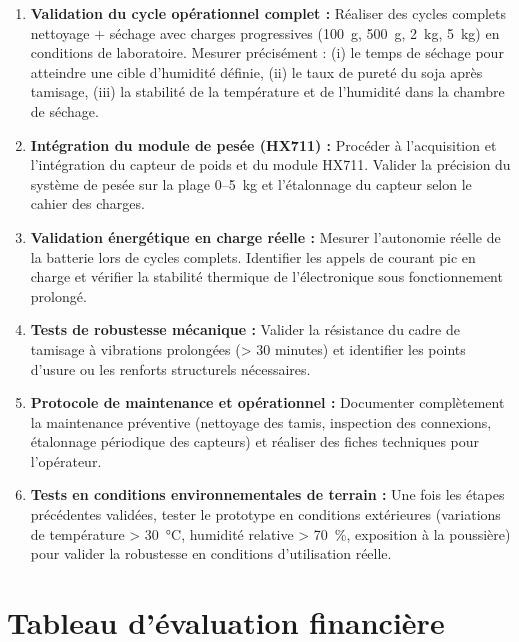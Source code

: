 \begin{enumerate}
    \item \textbf{Validation du cycle opérationnel complet :} Réaliser des cycles complets nettoyage + séchage avec charges progressives (100~g, 500~g, 2~kg, 5~kg) en conditions de laboratoire. Mesurer précisément : (i) le temps de séchage pour atteindre une cible d'humidité définie, (ii) le taux de pureté du soja après tamisage, (iii) la stabilité de la température et de l'humidité dans la chambre de séchage.
    
    \item \textbf{Intégration du module de pesée (HX711) :} Procéder à l'acquisition et l'intégration du capteur de poids et du module HX711. Valider la précision du système de pesée sur la plage 0--5~kg et l'étalonnage du capteur selon le cahier des charges.
    
    \item \textbf{Validation énergétique en charge réelle :} Mesurer l'autonomie réelle de la batterie lors de cycles complets. Identifier les appels de courant pic en charge et vérifier la stabilité thermique de l'électronique sous fonctionnement prolongé.
    
    \item \textbf{Tests de robustesse mécanique :} Valider la résistance du cadre de tamisage à vibrations prolongées (> 30 minutes) et identifier les points d'usure ou les renforts structurels nécessaires.
    
    \item \textbf{Protocole de maintenance et opérationnel :} Documenter complètement la maintenance préventive (nettoyage des tamis, inspection des connexions, étalonnage périodique des capteurs) et réaliser des fiches techniques pour l'opérateur.
    
    \item \textbf{Tests en conditions environnementales de terrain :} Une fois les étapes précédentes validées, tester le prototype en conditions extérieures (variations de température > 30~°C, humidité relative > 70~\%, exposition à la poussière) pour valider la robustesse en conditions d'utilisation réelle.
\end{enumerate}

\section{Tableau d'évaluation financière}

